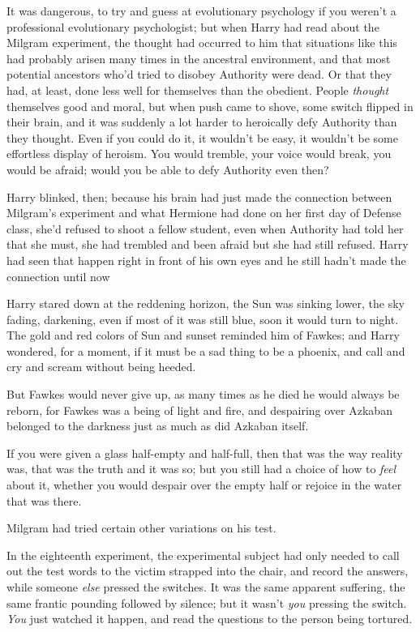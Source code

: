 It was dangerous, to try and guess at evolutionary psychology if you weren't a
professional evolutionary psychologist; but when Harry had read about the
Milgram experiment, the thought had occurred to him that situations like this
had probably arisen many times in the ancestral environment, and that most
potential ancestors who'd tried to disobey Authority were dead. Or that they
had, at least, done less well for themselves than the obedient. People
\emph{thought} themselves good and moral, but when push came to shove, some
switch flipped in their brain, and it was suddenly a lot harder to heroically
defy Authority than they thought. Even if you could do it, it wouldn't be easy,
it wouldn't be some effortless display of heroism. You would tremble, your
voice would break, you would be afraid; would you be able to defy Authority
even then?

Harry blinked, then; because his brain had just made the connection between
Milgram's experiment and what Hermione had done on her first day of Defense
class, she'd refused to shoot a fellow student, even when Authority had told
her that she must, she had trembled and been afraid but she had still refused.
Harry had seen that happen right in front of his own eyes and he still hadn't
made the connection until now{\el}

Harry stared down at the reddening horizon, the Sun was sinking lower, the sky
fading, darkening, even if most of it was still blue, soon it would turn to
night. The gold and red colors of Sun and sunset reminded him of Fawkes; and
Harry wondered, for a moment, if it must be a sad thing to be a phoenix, and
call and cry and scream without being heeded.

But Fawkes would never give up, as many times as he died he would always be
reborn, for Fawkes was a being of light and fire, and despairing over Azkaban
belonged to the darkness just as much as did Azkaban itself.

If you were given a glass half-empty and half-full, then that was the way
reality was, that was the truth and it was so; but you still had a choice of
how to \emph{feel} about it, whether you would despair over the empty half or
rejoice in the water that was there.

Milgram had tried certain other variations on his test.

In the eighteenth experiment, the experimental subject had only needed to call
out the test words to the victim strapped into the chair, and record the
answers, while someone \emph{else} pressed the switches. It was the same
apparent suffering, the same frantic pounding followed by silence; but it
wasn't \emph{you} pressing the switch. \emph{You} just watched it happen, and
read the questions to the person being tortured.

